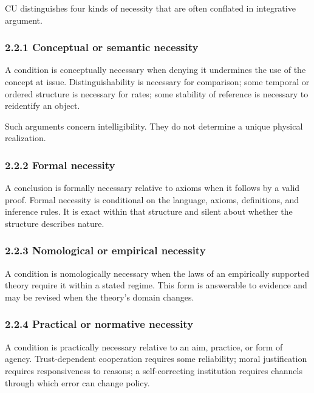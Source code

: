 \documentclass[
  11pt,
]{article}
\begin{document}
CU distinguishes four kinds of necessity that are often conflated in
integrative argument.

\subsubsection{2.2.1 Conceptual or semantic
necessity}\label{conceptual-or-semantic-necessity}

A condition is conceptually necessary when denying it undermines the use
of the concept at issue. Distinguishability is necessary for comparison;
some temporal or ordered structure is necessary for rates; some
stability of reference is necessary to reidentify an object.

Such arguments concern intelligibility. They do not determine a unique
physical realization.

\subsubsection{2.2.2 Formal necessity}\label{formal-necessity}

A conclusion is formally necessary relative to axioms when it follows by
a valid proof. Formal necessity is conditional on the language, axioms,
definitions, and inference rules. It is exact within that structure and
silent about whether the structure describes nature.

\subsubsection{2.2.3 Nomological or empirical
necessity}\label{nomological-or-empirical-necessity}

A condition is nomologically necessary when the laws of an empirically
supported theory require it within a stated regime. This form is
answerable to evidence and may be revised when the theory's domain
changes.

\subsubsection{2.2.4 Practical or normative
necessity}\label{practical-or-normative-necessity}

A condition is practically necessary relative to an aim, practice, or
form of agency. Trust-dependent cooperation requires some reliability;
moral justification requires responsiveness to reasons; a
self-correcting institution requires channels through which error can
change policy.
\end{document}
